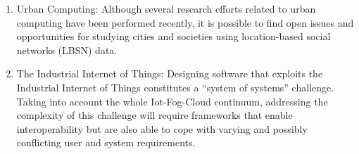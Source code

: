 \begin{enumerate}
    \item Urban Computing: Although several research efforts related to urban computing have been performed recently, it is possible
    to find open issues and opportunities for studying cities and societies using location-based social networks (LBSN) data.
    \item The Industrial Internet of Things: Designing software that exploits the Industrial Internet of Things constitutes a “system of systems” challenge. Taking into account the whole Iot-Fog-Cloud continuum, addressing the complexity of this challenge will require frameworks that enable interoperability but are also able to cope with varying and possibly conflicting user and system requirements.
    
\end{enumerate}

\label{sec:future-steps}